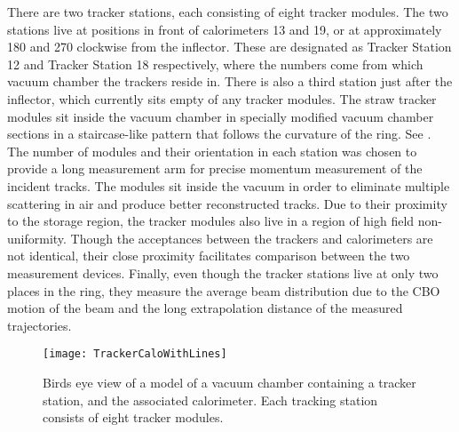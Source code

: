 There are two tracker stations, each consisting of eight tracker modules. The two stations live at positions in front of calorimeters 13 and 19, or at approximately 180\textdegree{} and 270\textdegree{} clockwise from the inflector. These are designated as Tracker Station 12 and Tracker Station 18 respectively, where the numbers come from which vacuum chamber the trackers reside in. There is also a third station just after the inflector, which currently sits empty of any tracker modules. The straw tracker modules sit inside the vacuum chamber in specially modified vacuum chamber sections in a staircase-like pattern that follows the curvature of the ring. See . The number of modules and their orientation in each station was chosen to provide a long measurement arm for precise momentum measurement of the incident tracks. The modules sit inside the vacuum in order to eliminate multiple scattering in air and produce better reconstructed tracks. Due to their proximity to the storage region, the tracker modules also live in a region of high field non-uniformity. Though the acceptances between the trackers and calorimeters are not identical, their close proximity facilitates comparison between the two measurement devices. Finally, even though the tracker stations live at only two places in the ring, they measure the average beam distribution due to the CBO motion of the beam and the long extrapolation distance of the measured trajectories.


\begin{figure}[]
    \centering
    \texttt{[image: TrackerCaloWithLines]}
    \caption[TrackerCaloWithLines]{Birds eye view of a model of a vacuum chamber containing a tracker station, and the associated calorimeter. Each tracking station consists of eight tracker modules.}
    \label{fig:TrackerCaloWithLines}
\end{figure}





